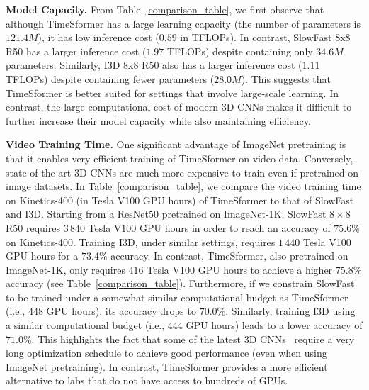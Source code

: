 \documentclass{article}
\begin{document}
\textbf{Model Capacity.} From Table~\ref{comparison_table}, we first observe that although TimeSformer has a large learning capacity (the number of parameters is $121.4M$), it has low inference cost ($0.59$ in TFLOPs).  In contrast, SlowFast 8x8 R50 has a larger inference cost ($1.97$ TFLOPs) despite containing only $34.6M$ parameters. Similarly, I3D 8x8 R50 also has a larger inference cost ($1.11$ TFLOPs) despite containing fewer parameters ($28.0M$). This suggests that TimeSformer is better suited for settings that involve large-scale learning. In contrast, the large computational cost of modern 3D CNNs makes it difficult to further increase their model capacity while also maintaining efficiency.

\textbf{Video Training Time.} One significant advantage of ImageNet pretraining is that it enables very efficient training of TimeSformer on video data. Conversely, state-of-the-art 3D CNNs are much more expensive to train even if pretrained on image datasets. In Table~\ref{comparison_table}, we compare the video training time on Kinetics-400 (in Tesla V100 GPU hours) of TimeSformer to that of SlowFast and I3D. Starting from a ResNet50 pretrained on ImageNet-1K, SlowFast $8\times8$ R50 requires $3\,840$ Tesla V100 GPU hours in order to reach an accuracy of $75.6\%$ on Kinetics-400. Training I3D, under similar settings, requires $1\,440$ Tesla V100 GPU hours for a $73.4\%$ accuracy. In contrast, TimeSformer, also pretrained on ImageNet-1K, only requires $416$ Tesla V100 GPU hours to achieve a higher $75.8\%$ accuracy (see Table~\ref{comparison_table}). Furthermore, if we constrain SlowFast to be trained under a somewhat similar computational budget as TimeSformer (i.e., $448$ GPU hours), its accuracy drops to $70.0\%$. Similarly, training I3D using a similar computational budget (i.e., $444$ GPU hours) leads to a lower accuracy of $71.0\%$. This highlights the fact that some of the latest 3D CNNs~\cite{slowfast,feichtenhofer2020x3d} require a very long optimization schedule to achieve good performance (even when using ImageNet pretraining). In contrast, TimeSformer provides a more efficient alternative to labs that do not have access to hundreds of GPUs.

\end{document}
